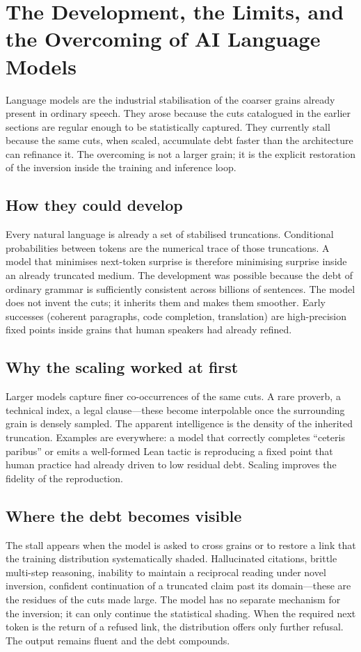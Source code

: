 \documentclass[11pt,a4paper]{article}
\begin{document}
\section{The Development, the Limits, and the Overcoming of AI Language Models}

Language models are the industrial stabilisation of the coarser grains already present in ordinary speech. They arose because the cuts catalogued in the earlier sections are regular enough to be statistically captured. They currently stall because the same cuts, when scaled, accumulate debt faster than the architecture can refinance it. The overcoming is not a larger grain; it is the explicit restoration of the inversion inside the training and inference loop.

\subsection{How they could develop} Every natural language is already a set of stabilised truncations. Conditional probabilities between tokens are the numerical trace of those truncations. A model that minimises next-token surprise is therefore minimising surprise inside an already truncated medium. The development was possible because the debt of ordinary grammar is sufficiently consistent across billions of sentences. The model does not invent the cuts; it inherits them and makes them smoother. Early successes (coherent paragraphs, code completion, translation) are high-precision fixed points inside grains that human speakers had already refined.

\subsection{Why the scaling worked at first} Larger models capture finer co-occurrences of the same cuts. A rare proverb, a technical index, a legal clause—these become interpolable once the surrounding grain is densely sampled. The apparent intelligence is the density of the inherited truncation. Examples are everywhere: a model that correctly completes ``ceteris paribus'' or emits a well-formed Lean tactic is reproducing a fixed point that human practice had already driven to low residual debt. Scaling improves the fidelity of the reproduction.

\subsection{Where the debt becomes visible} The stall appears when the model is asked to cross grains or to restore a link that the training distribution systematically shaded. Hallucinated citations, brittle multi-step reasoning, inability to maintain a reciprocal reading under novel inversion, confident continuation of a truncated claim past its domain—these are the residues of the cuts made large. The model has no separate mechanism for the inversion; it can only continue the statistical shading. When the required next token is the return of a refused link, the distribution offers only further refusal. The output remains fluent and the debt compounds.
\end{document}
